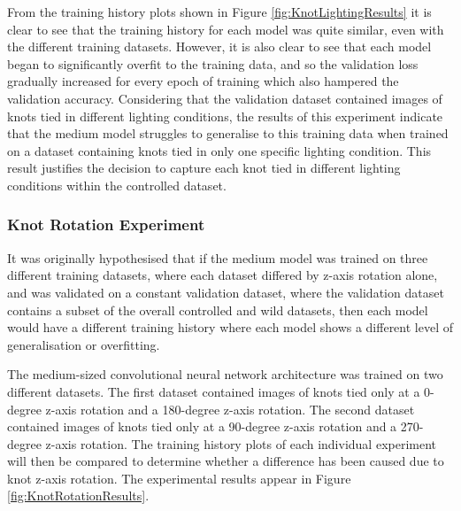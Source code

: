 \documentclass{l4proj}
\begin{document}
From the training history plots shown in Figure \ref{fig:KnotLightingResults} it is clear to see that the training history for each model was quite similar, even with the different training datasets. However, it is also clear to see that each model began to significantly overfit to the training data, and so the validation loss gradually increased for every epoch of training which also hampered the validation accuracy. Considering that the validation dataset contained images of knots tied in different lighting conditions, the results of this experiment indicate that the medium model struggles to generalise to this training data when trained on a dataset containing knots tied in only one specific lighting condition. This result justifies the decision to capture each knot tied in different lighting conditions within the controlled dataset.

\subsubsection{Knot Rotation Experiment}
It was originally hypothesised that if the medium model was trained on three different training datasets, where each dataset differed by z-axis rotation alone, and was validated on a constant validation dataset, where the validation dataset contains a subset of the overall controlled and wild datasets, then each model would have a different training history where each model shows a different level of generalisation or overfitting.

The medium-sized convolutional neural network architecture was trained on two different datasets.
The first dataset contained images of knots tied only at a 0-degree z-axis rotation and a 180-degree z-axis rotation.
The second dataset contained images of knots tied only at a 90-degree z-axis rotation and a 270-degree z-axis rotation.
The training history plots of each individual experiment will then be compared to determine whether a difference has been caused due to knot z-axis rotation.
The experimental results appear in Figure \ref{fig:KnotRotationResults}.
\end{document}
